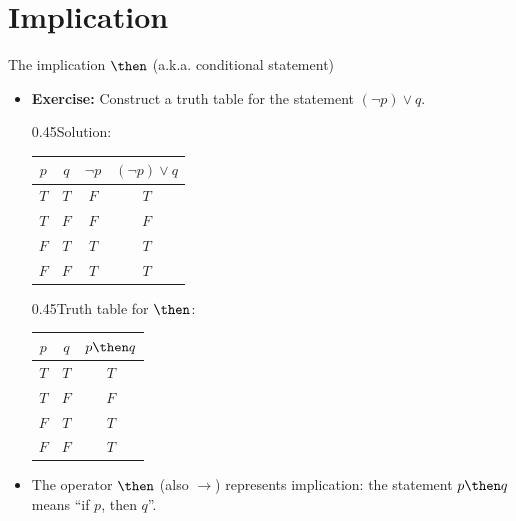 \documentclass[12pt,aspectratio=1610, handout]{beamer}
\begin{document}
\section{Implication}
\begin{frame}{The implication $\then$ (a.k.a. conditional statement)}
	\begin{itemize}
		\item \textbf{Exercise:} Construct a truth table for the statement $(\neg p) \vee q$. \p
\vspace{-3mm}	\begin{center}\begin{blockz}{0.45}{Solution:}
			\begin{tabular}{|c|c|c|c|}
					\hline
					$p$ & $q$ & $\neg p$ & $(\neg p) \vee q$ \\
					\hline
					$T$ & $T$ &$F$ & $T$ \\
					\hline
					$T$ & $F$ &$F$ & $F$ \\
					\hline
					$F$ & $T$ & $T$ & $T$ \\ 
					\hline
					$F$ & $F$ & $T$ & $T$ \\
					\hline
				\end{tabular}
				\end{blockz}\p\hspace{5mm}
				\begin{blockz}{0.45}{Truth table for $\then$:} 			
					\begin{tabular}{|c|c|c|}
						\hline
						$p$ & $q$ & $p \then q$ \\
						\hline
						$T$ & $T$ & $T$ \\
						\hline
						$T$ & $F$ & $F$ \\
						\hline
						$F$ & $T$ & $T$ \\ 
						\hline
						$F$ & $F$ & $T$ \\
						\hline
					\end{tabular}
					\end{blockz}\p\vspace{2mm}
		\end{center}
		\item The operator $\then$ (also $\rightarrow$) represents implication: the statement $p \then q$ means ``if $p$, then $q$''. \p
	\end{itemize}
\end{frame}
\end{document}
